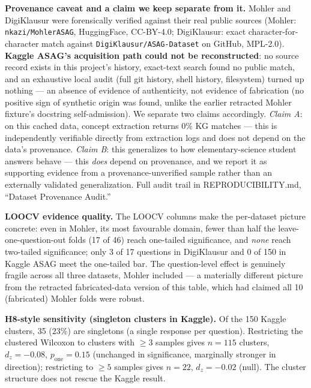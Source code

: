 \documentclass[conference]{IEEEtran}
\begin{document}
\textbf{Provenance caveat and a claim we keep separate from it.} Mohler
and DigiKlausur were forensically verified against their real public
sources (Mohler: \texttt{nkazi/MohlerASAG}, HuggingFace, CC-BY-4.0;
DigiKlausur: exact character-for-character match against
\texttt{DigiKlausur/ASAG-Dataset} on GitHub, MPL-2.0). \textbf{Kaggle
ASAG's acquisition path could not be reconstructed}: no source record
exists in this project's history, exact-text search found no public
match, and an exhaustive local audit (full git history, shell history,
filesystem) turned up nothing --- an absence of evidence of authenticity,
not evidence of fabrication (no positive sign of synthetic origin was
found, unlike the earlier retracted Mohler fixture's docstring
self-admission). We separate two claims accordingly. \emph{Claim A}: on
this cached data, concept extraction returns 0\% KG matches --- this is
independently verifiable directly from extraction logs and does not
depend on the data's provenance. \emph{Claim B}: this generalizes to how
elementary-science student answers behave --- this \emph{does} depend on
provenance, and we report it as supporting evidence from a
provenance-unverified sample rather than an externally validated
generalization. Full audit trail in REPRODUCIBILITY.md, ``Dataset
Provenance Audit.''

\textbf{LOOCV evidence quality.}
The LOOCV columns make the per-dataset picture concrete: even in Mohler,
its most favourable domain, fewer than half the leave-one-question-out
folds (17 of 46) reach one-tailed significance, and \emph{none} reach
two-tailed significance; only 3 of 17 questions in DigiKlausur and 0 of
150 in Kaggle ASAG meet the one-tailed bar. The question-level effect is
genuinely fragile across all three datasets, Mohler included --- a
materially different picture from the retracted fabricated-data version
of this table, which had claimed all 10 (fabricated) Mohler folds were
robust.

\textbf{H8-style sensitivity (singleton clusters in Kaggle).} Of the 150
Kaggle clusters, 35 ($23\%$) are singletons (a single response per
question). Restricting the clustered Wilcoxon to clusters with $\geq 3$
samples gives $n = 115$ clusters, $d_z = -0.08$, $p_{\text{one}} = 0.15$
(unchanged in significance, marginally stronger in direction);
restricting to $\geq 5$ samples gives $n = 22$, $d_z = -0.02$ (null).
The cluster structure does not rescue the Kaggle result.
\end{document}
